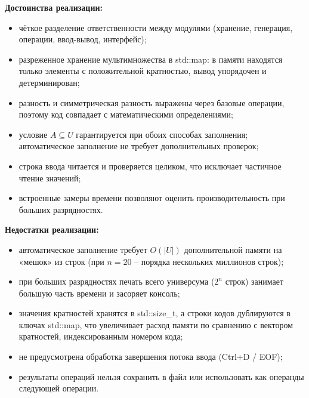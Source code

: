 \documentclass[14pt,a4paper]{extreport}
\newcommand{\card}[1]{\left|#1\right|}
\newcommand{\code}[1]{{\ttfamily #1}}
\begin{document}
\textbf{Достоинства реализации:}
\begin{itemize}
\item чёткое разделение ответственности между модулями (хранение, генерация, операции, ввод-вывод, интерфейс);
\item разреженное хранение мультимножества в \code{std::map}: в памяти находятся только элементы с положительной кратностью, вывод упорядочен и детерминирован;
\item разность и симметрическая разность выражены через базовые операции, поэтому код совпадает с математическими определениями;
\item условие $A\subseteq U$ гарантируется при обоих способах заполнения; автоматическое заполнение не требует дополнительных проверок;
\item строка ввода читается и проверяется целиком, что исключает частичное чтение значений;
\item встроенные замеры времени позволяют оценить производительность при больших разрядностях.
\end{itemize}

\textbf{Недостатки реализации:}
\begin{itemize}
\item автоматическое заполнение требует $O(\card{U})$ дополнительной памяти на «мешок» из строк (при $n=20$ -- порядка нескольких миллионов строк);
\item при больших разрядностях печать всего универсума ($2^n$ строк) занимает большую часть времени и засоряет консоль;
\item значения кратностей хранятся в \code{std::size\_t}, а строки кодов дублируются в ключах \code{std::map}, что увеличивает расход памяти по сравнению с вектором кратностей, индексированным номером кода;
\item не предусмотрена обработка завершения потока ввода (Ctrl+D / EOF);
\item результаты операций нельзя сохранить в файл или использовать как операнды следующей операции.
\end{itemize}
\end{document}
